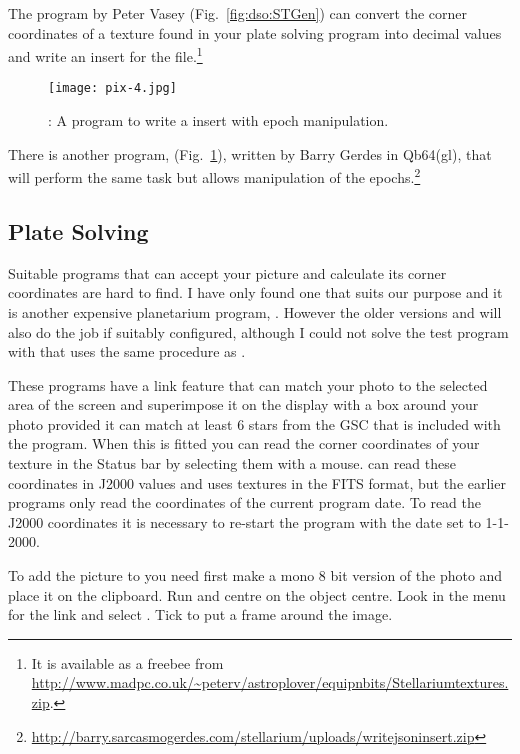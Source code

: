 The program  by Peter Vasey (Fig.~\ref{fig:dso:STGen}) can convert the corner coordinates of a
texture found in your plate solving program into decimal values and write an
insert for the  file.\footnote{It is available as a freebee
from
\url{http://www.madpc.co.uk/~peterv/astroplover/equipnbits/Stellariumtextures.zip}.}

\begin{figure}[t]
\centering\texttt{[image: pix-4.jpg]}
\caption{: A program to write a  insert with epoch manipulation.}
\label{fig:dso:ReadDSS}
\end{figure}

There is another program,  (Fig.~\ref{fig:dso:ReadDSS}), written by Barry Gerdes in Qb64(gl), that will perform the same
task but allows manipulation of the epochs.\footnote{
\url{http://barry.sarcasmogerdes.com/stellarium/uploads/writejsoninsert.zip}}

\subsection{Plate Solving}%
\label{sec:dso:plateSolving}

Suitable programs that can accept your picture and calculate its corner
coordinates are hard to find. I have only found one that suits our
purpose and it is another expensive planetarium program, .
However the older versions  and  will also do the job if
suitably configured, although I could not solve the test program with 
 that uses the same procedure as .

These programs have a link feature that can match your photo to the
selected area of the screen and superimpose it on the display with a box
around your photo provided it can match at least 6 stars from the GSC
that is included with the program. When this is fitted you can read the
corner coordinates of your texture in the Status bar by selecting them
with a mouse.  can read these coordinates in J2000 values and
uses textures in the FITS format, but the earlier programs only read the
coordinates of the current program date. To read the J2000 coordinates
it is necessary to re-start the program with the date set to 1-1-2000.

To add the picture to  you need first make a mono 8 bit version
of the photo and place it on the clipboard. Run  and centre on the
object centre. Look in the  menu for the  link and select
. Tick  to put a frame around the image.

